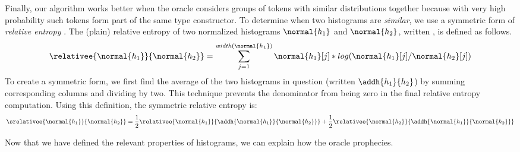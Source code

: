 Finally, our algorithm works better when the oracle considers groups
of tokens with similar distributions together because with very high
probability such tokens form part of the same type constructor. 
To determine when two histograms are {\em similar}, we use
a symmetric form of {\em relative entropy} \cite{Lin91:divergence}.
The (plain) relative entropy
of two normalized histograms $\normal{h_1}$ and $\normal{h_2}$, 
written , is
defined as follows.
\[
 \relativee{\normal{h_1}}{\normal{h_2}} 
   = \sum_{j=1}^{\mathit{width}(\normal{h_1})} \normal{h_1}[j]*log(\normal{h_1}[j]/\normal{h_2}[j])
\]
To create a symmetric form, we first find the average of the two
histograms in question (written $\addh{h_1}{h_2}$)
by summing corresponding columns and dividing by two.  This technique
prevents the denominator from being zero in the 
final relative entropy computation.  Using this definition, the symmetric
relative entropy is:
\[
 \srelativee{\normal{h_1}}{\normal{h_2}} 
   = \frac{1}{2}  \relativee{\normal{h_1}}{\addh{\normal{h_1}}{\normal{h_2}}}
   +  \frac{1}{2}  \relativee{\normal{h_2}}{\addh{\normal{h_1}}{\normal{h_2}}}
\]

Now that we have defined the relevant properties of histograms,
we can explain how the oracle prophecies.

